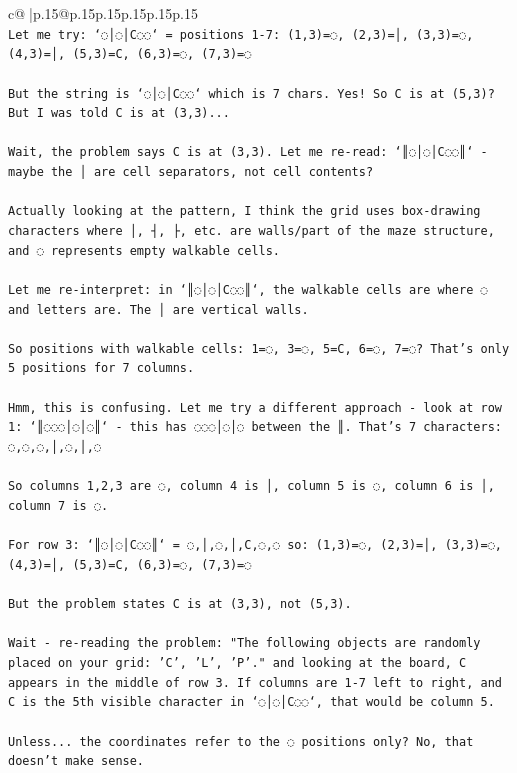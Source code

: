 \documentclass{article}
\begin{document}
{\begin{supertabular}{c@{$\;$}|p{.15\linewidth}@{}p{.15\linewidth}p{.15\linewidth}p{.15\linewidth}p{.15\linewidth}p{.15\linewidth}}
{{{\\ 
\texttt{Let me try: `◌│◌│C◌◌` = positions 1{-}7: (1,3)=◌, (2,3)=│, (3,3)=◌, (4,3)=│, (5,3)=C, (6,3)=◌, (7,3)=◌} \\
\\ 
\texttt{But the string is `◌│◌│C◌◌` which is 7 chars. Yes! So C is at (5,3)? But I was told C is at (3,3)...} \\
\\ 
\texttt{Wait, the problem says C is at (3,3). Let me re{-}read: `║◌│◌│C◌◌║` {-} maybe the │ are cell separators, not cell contents?} \\
\\ 
\texttt{Actually looking at the pattern, I think the grid uses box{-}drawing characters where │, ┤, ├, etc. are walls/part of the maze structure, and ◌ represents empty walkable cells.} \\
\\ 
\texttt{Let me re{-}interpret: in `║◌│◌│C◌◌║`, the walkable cells are where ◌ and letters are. The │ are vertical walls.} \\
\\ 
\texttt{So positions with walkable cells: 1=◌, 3=◌, 5=C, 6=◌, 7=◌? That's only 5 positions for 7 columns.} \\
\\ 
\texttt{Hmm, this is confusing. Let me try a different approach {-} look at row 1: `║◌◌◌│◌│◌║` {-} this has ◌◌◌│◌│◌ between the ║. That's 7 characters: ◌,◌,◌,│,◌,│,◌} \\
\\ 
\texttt{So columns 1,2,3 are ◌, column 4 is │, column 5 is ◌, column 6 is │, column 7 is ◌.} \\
\\ 
\texttt{For row 3: `║◌│◌│C◌◌║` = ◌,│,◌,│,C,◌,◌ so: (1,3)=◌, (2,3)=│, (3,3)=◌, (4,3)=│, (5,3)=C, (6,3)=◌, (7,3)=◌} \\
\\ 
\texttt{But the problem states C is at (3,3), not (5,3). } \\
\\ 
\texttt{Wait {-} re{-}reading the problem: "The following objects are randomly placed on your grid: 'C', 'L', 'P'." and looking at the board, C appears in the middle of row 3. If columns are 1{-}7 left to right, and C is the 5th visible character in `◌│◌│C◌◌`, that would be column 5.} \\
\\ 
\texttt{Unless... the coordinates refer to the ◌ positions only? No, that doesn't make sense.} \\
}}}
\end{supertabular}}
\end{document}
